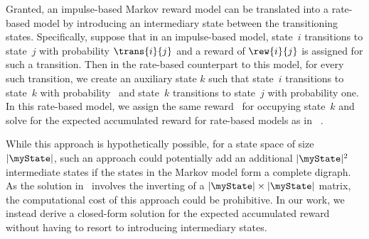 
Granted, an impulse-based Markov reward model can be translated into a rate-based model by introducing an intermediary state between the transitioning states.  Specifically, suppose that in an impulse-based model, state~$i$ transitions to state~$j$ with probability $\trans{i}{j}$ and a reward of $\rew{i}{j}$ is assigned for such a transition.  Then in the rate-based counterpart to this model, for every such transition, we create an auxiliary state $k$ such that state~$i$ transitions to state~$k$ with probability~ and state~$k$ transitions to state~$j$ with probability one.  In this rate-based model, we assign the same reward~ for occupying state~$k$ and solve for the expected accumulated reward for rate-based models as in~\cite{howard1971dynamicv2} .  %

While this approach is hypothetically possible, for a state space of size $|\myState|$, such an approach could potentially add an additional $|\myState|^2$ intermediate states if the states in the Markov model form a complete digraph.  As the solution in~\cite{howard1971dynamicv2} involves the inverting of a $|\myState| \times |\myState|$ matrix, the computational cost of this approach could be prohibitive.  In our work, we instead derive a closed-form solution for the expected accumulated reward without having to resort to introducing intermediary states.



